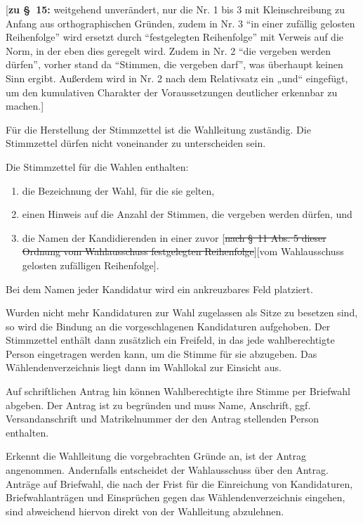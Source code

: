 \documentclass[%
draft,%
multilinesections%
]{fswo}
\newcommand\oldT[1]  {{\color{Gray}[\st{#1}]}}
\newcommand\newT[1]  {{\color{Green}[#1]}}
\newcommand\bemFr[1] {{\color{Red}[#1]}}
\newcommand\oldT[1]{}%
\newcommand\newT[1]{#1}
\newcommand\bemFr[1]{}%
\newcommand\change[2]{\oldT{#1}\newT{#2}}
\begin{document}
\bemFr{\textbf{zu \S~15:}
weitgehend unverändert, nur die Nr. 1 bis 3 mit Kleinschreibung zu Anfang aus orthographischen Gründen,
zudem in Nr. 3 \enquote{in einer zufällig gelosten Reihenfolge} wird ersetzt durch \enquote{festgelegten Reihenfolge} mit Verweis auf die Norm,
in der eben dies geregelt wird. Zudem in Nr. 2 \enquote{die vergeben werden dürfen}, vorher stand da \enquote{Stimmen, die vergeben darf}, was überhaupt keinen Sinn ergibt.
Außerdem wird in Nr. 2 nach dem Relativsatz ein „und“ eingefügt, um den kumulativen Charakter der Voraussetzungen deutlicher erkennbar zu machen.}

\begin{contract}
Für die Herstellung der Stimmzettel ist die Wahlleitung zuständig.
Die Stimmzettel dürfen nicht voneinander zu unterscheiden sein.

Die Stimmzettel für die Wahlen enthalten:
\begin{enumerate}
\item die Bezeichnung der Wahl, für die sie gelten,
\item einen Hinweis auf die Anzahl der Stimmen, die vergeben werden dürfen, und
\item die Namen der Kandidierenden in einer zuvor \change{nach \S~11 Abs. 5 dieser Ordnung vom Wahlausschuss festgelegten Reihenfolge}{vom Wahlausschuss gelosten zufälligen Reihenfolge}.
\end{enumerate}
Bei dem Namen jeder Kandidatur wird ein ankreuzbares Feld platziert.

Wurden nicht mehr Kandidaturen zur Wahl zugelassen als Sitze zu besetzen sind, so wird die Bindung an die vorgeschlagenen Kandidaturen aufgehoben.
Der Stimmzettel enthält dann zusätzlich ein Freifeld, in das jede wahlberechtigte Person eingetragen werden kann, um die Stimme für sie abzugeben.
Das Wählendenverzeichnis liegt dann im Wahllokal zur Einsicht aus.
\label{cls-stimmzettel:abs-freifeld}

\label{cls-briefwahl}
Auf schriftlichen Antrag hin können Wahlberechtigte ihre Stimme per Briefwahl abgeben.
Der Antrag ist zu begründen und muss Name, Anschrift, ggf. Versandanschrift und Matrikelnummer der den Antrag stellenden Person enthalten.

Erkennt die Wahlleitung die vorgebrachten Gründe an, ist der Antrag angenommen.
Andernfalls entscheidet der Wahlausschuss über den Antrag.
Anträge auf Briefwahl, die nach der Frist für die Einreichung von Kandidaturen, Briefwahlanträgen und Einsprüchen gegen das Wählendenverzeichnis eingehen, sind abweichend hiervon direkt von der Wahlleitung abzulehnen.


\end{contract}
\end{document}
